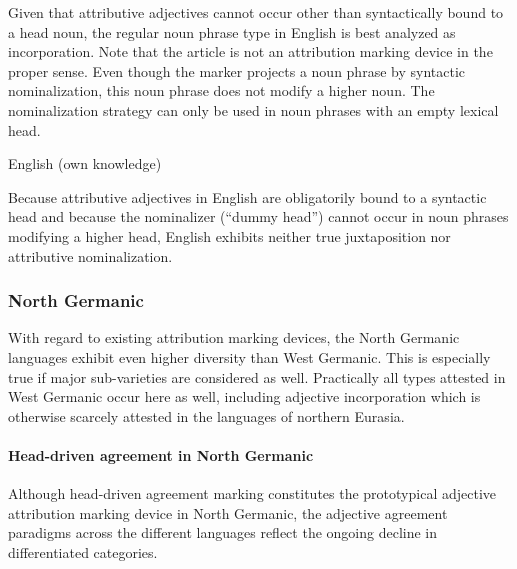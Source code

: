 Given that attributive adjectives cannot occur other than syntactically bound to a head noun, the regular noun phrase type in English is best analyzed as incorporation. Note that the article is not an attribution marking device in the proper sense. Even though the marker projects a noun phrase by syntactic nominalization, this noun phrase does not modify a higher noun. The nominalization strategy can only be used in noun phrases with an empty lexical head.
\begin{exe}
\ex \rm{English (own knowledge)}
\begin{xlist}
\end{xlist}
\end{exe}
Because attributive adjectives in English are obligatorily bound to a syntactic head and because the nominalizer (“dummy head”) cannot occur in noun phrases modifying a higher head, English exhibits neither true juxtaposition nor attributive nominalization.

\subsubsection{North Germanic} \label{n-germanic synchr}
With regard to existing attribution marking devices, the North Germanic languages exhibit even higher diversity than West Germanic. This is especially true if major sub-varieties are considered as well. Practically all types attested in West Germanic occur here as well, including adjective incorporation which is otherwise scarcely attested in the languages of northern Eurasia.

\paragraph{Head-driven agreement in North Germanic} 
Although head-driven agreement marking constitutes the prototypical adjective attribution marking device in North Germanic, the adjective agreement paradigms across the different languages reflect the ongoing decline in differentiated categories.

